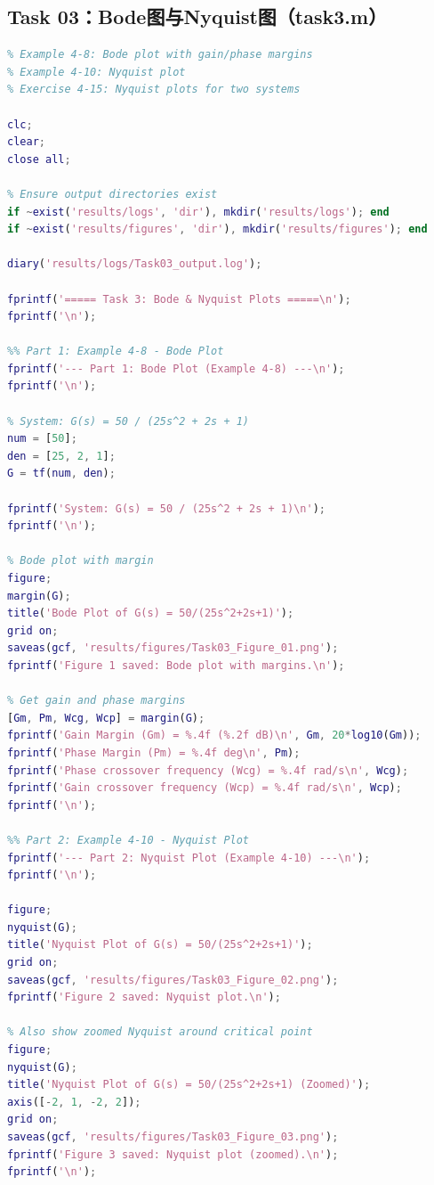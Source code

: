 \documentclass{../common/SCNU_Experimental_Report}
\begin{document}
\subsection{Task 03：Bode图与Nyquist图（task3.m）}
\begin{lstlisting}[language=Matlab]
%% task3.m - Experiment 7, Task 3: Bode & Nyquist Plots
% Example 4-8: Bode plot with gain/phase margins
% Example 4-10: Nyquist plot
% Exercise 4-15: Nyquist plots for two systems

clc;
clear;
close all;

% Ensure output directories exist
if ~exist('results/logs', 'dir'), mkdir('results/logs'); end
if ~exist('results/figures', 'dir'), mkdir('results/figures'); end

diary('results/logs/Task03_output.log');

fprintf('===== Task 3: Bode & Nyquist Plots =====\n');
fprintf('\n');

%% Part 1: Example 4-8 - Bode Plot
fprintf('--- Part 1: Bode Plot (Example 4-8) ---\n');
fprintf('\n');

% System: G(s) = 50 / (25s^2 + 2s + 1)
num = [50];
den = [25, 2, 1];
G = tf(num, den);

fprintf('System: G(s) = 50 / (25s^2 + 2s + 1)\n');
fprintf('\n');

% Bode plot with margin
figure;
margin(G);
title('Bode Plot of G(s) = 50/(25s^2+2s+1)');
grid on;
saveas(gcf, 'results/figures/Task03_Figure_01.png');
fprintf('Figure 1 saved: Bode plot with margins.\n');

% Get gain and phase margins
[Gm, Pm, Wcg, Wcp] = margin(G);
fprintf('Gain Margin (Gm) = %.4f (%.2f dB)\n', Gm, 20*log10(Gm));
fprintf('Phase Margin (Pm) = %.4f deg\n', Pm);
fprintf('Phase crossover frequency (Wcg) = %.4f rad/s\n', Wcg);
fprintf('Gain crossover frequency (Wcp) = %.4f rad/s\n', Wcp);
fprintf('\n');

%% Part 2: Example 4-10 - Nyquist Plot
fprintf('--- Part 2: Nyquist Plot (Example 4-10) ---\n');
fprintf('\n');

figure;
nyquist(G);
title('Nyquist Plot of G(s) = 50/(25s^2+2s+1)');
grid on;
saveas(gcf, 'results/figures/Task03_Figure_02.png');
fprintf('Figure 2 saved: Nyquist plot.\n');

% Also show zoomed Nyquist around critical point
figure;
nyquist(G);
title('Nyquist Plot of G(s) = 50/(25s^2+2s+1) (Zoomed)');
axis([-2, 1, -2, 2]);
grid on;
saveas(gcf, 'results/figures/Task03_Figure_03.png');
fprintf('Figure 3 saved: Nyquist plot (zoomed).\n');
fprintf('\n');


\end{lstlisting}
\end{document}

